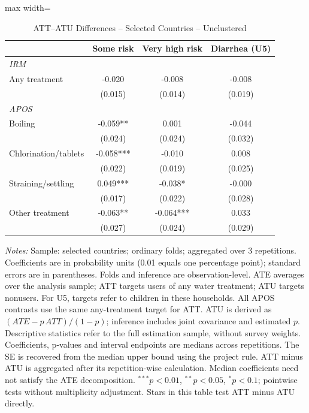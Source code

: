 \begin{table}[htbp]
\centering
\caption{ATT--ATU Differences -- Selected Countries -- Unclustered}
\label{tab:ate-att-atu-selected-countries-iid-aggregated-difference}
\scriptsize
\setlength{\tabcolsep}{4pt}
\renewcommand{\arraystretch}{0.92}
\begin{adjustbox}{max width=\linewidth}
\begin{tabular}{lccc}
\hline\hline
 & Some risk & Very high risk & Diarrhea (U5) \\
\midrule
\multicolumn{4}{l}{\textit{IRM}} \\
Any treatment & -0.020 & -0.008 & -0.008 \\
 & (0.015) & (0.014) & (0.019) \\
\midrule
\multicolumn{4}{l}{\textit{APOS}} \\
Boiling & -0.059** & 0.001 & -0.044 \\
 & (0.024) & (0.024) & (0.032) \\
Chlorination/tablets & -0.058*** & -0.010 & 0.008 \\
 & (0.022) & (0.019) & (0.025) \\
Straining/settling & 0.049*** & -0.038* & -0.000 \\
 & (0.017) & (0.022) & (0.028) \\
Other treatment & -0.063** & -0.064*** & 0.033 \\
 & (0.027) & (0.024) & (0.029) \\
\hline\hline
\end{tabular}
\end{adjustbox}
\par\vspace{3pt}
\begin{minipage}{\linewidth}\scriptsize \textit{Notes:} Sample: selected countries; ordinary folds; aggregated over 3 repetitions. Coefficients are in probability units (0.01 equals one percentage point); standard errors are in parentheses. Folds and inference are observation-level. ATE averages over the analysis sample; ATT targets users of any water treatment; ATU targets nonusers. For U5, targets refer to children in these households. All APOS contrasts use the same any-treatment target for ATT. ATU is derived as $(ATE-p\,ATT)/(1-p)$; inference includes joint covariance and estimated $p$. Descriptive statistics refer to the full estimation sample, without survey weights. Coefficients, p-values and interval endpoints are medians across repetitions. The SE is recovered from the median upper bound using the project rule. ATT minus ATU is aggregated after its repetition-wise calculation. Median coefficients need not satisfy the ATE decomposition. $^{***}p<0.01$, $^{**}p<0.05$, $^{*}p<0.1$; pointwise tests without multiplicity adjustment. Stars in this table test ATT minus ATU directly.\end{minipage}
\end{table}
